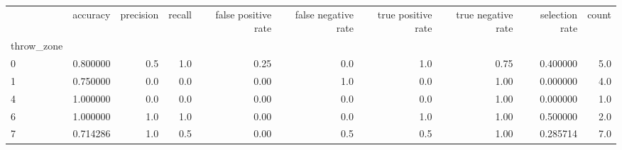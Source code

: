 \begin{tabular}{lrrrrrrrrr}
\toprule
{} &  accuracy &  precision &  recall &  false positive rate &  false negative rate &  true positive rate &  true negative rate &  selection rate &  count \\
throw\_zone &           &            &         &                      &                      &                     &                     &                 &        \\
\midrule
0          &  0.800000 &        0.5 &     1.0 &                 0.25 &                  0.0 &                 1.0 &                0.75 &        0.400000 &    5.0 \\
1          &  0.750000 &        0.0 &     0.0 &                 0.00 &                  1.0 &                 0.0 &                1.00 &        0.000000 &    4.0 \\
4          &  1.000000 &        0.0 &     0.0 &                 0.00 &                  0.0 &                 0.0 &                1.00 &        0.000000 &    1.0 \\
6          &  1.000000 &        1.0 &     1.0 &                 0.00 &                  0.0 &                 1.0 &                1.00 &        0.500000 &    2.0 \\
7          &  0.714286 &        1.0 &     0.5 &                 0.00 &                  0.5 &                 0.5 &                1.00 &        0.285714 &    7.0 \\
\bottomrule
\end{tabular}
